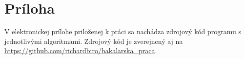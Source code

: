 \chapter*{Príloha}

V elektronickej prílohe priloženej k práci sa nachádza zdrojový kód programu s jednotlivými algoritmami. Zdrojový kód je zverejnený aj na \url{https://github.com/richardbiro/bakalarska_praca}.
